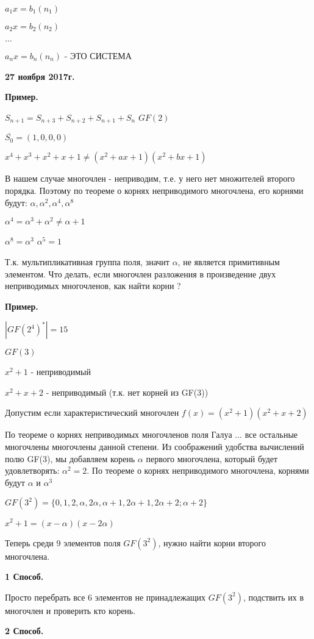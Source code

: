 \documentclass{article}
\begin{document}
$a_1x = b_1(n_1)$

$a_2x = b_2(n_2)$

$\ldots$

$a_nx = b_n(n_n)$ - ЭТО СИСТЕМА

\textbf {27 ноября 2017г.}

{\bf Пример.}

$S_{n+1}=S_{n+3}+S_{n+2}+S_{n+1}+S_n$ $GF(2)$

$\overline{S_0}=(1, 0, 0, 0)$

$x^4+x^3+x^2+x+1\ne (x^2+ax+1)(x^2+bx+1)$

В нашем случае многочлен - неприводим, т.е. у него нет множителей второго порядка. Поэтому по теореме о корнях неприводимого многочлена, его корнями будут: $\alpha, \alpha^2, \alpha^4, \alpha^8$

$\alpha^4=\alpha^3+\alpha^2\ne \alpha+1$

$\alpha^8=\alpha^3$ $\alpha^5=1$

Т.к. мультипликативная группа поля, значит $\alpha$, не является примитивным элементом. Что делать, если многочлен разложения в произведение двух неприводимых многочленов, как найти корни ?

{\bf Пример.}

$|GF(2^4)^*|=15$

$GF(3)$

$x^2+1$ - неприводимый

$x^2+x+2$ - неприводимый (т.к. нет корней из GF(3))

Допустим если характеристический многочлен $f(x)=(x^2+1)(x^2+x+2)$

По теореме о корнях неприводимых многочленов поля Галуа ... все остальные многочлены многочлены данной степени. Из соображений удобства вычислений полю GF(3), мы добавляем корень $\alpha$ первого многочлена, который будет удовлетворять: $\alpha^2=2$. По теореме о корнях неприводимого многочлена, корнями будут $\alpha$ и $\alpha^3$

$GF(3^2)=\{0, 1, 2, \alpha, 2\alpha, \alpha+1, 2\alpha+1, 2\alpha+2; \alpha+2\}$

$x^2+1=(x-\alpha)(x-2\alpha)$

Теперь среди 9 элементов поля $GF(3^2)$, нужно найти корни второго многочлена.

{\bf 1 Способ.}

Просто перебрать все 6 элементов не принадлежащих $GF(3^2)$, подствить их в многочлен и проверить кто корень.

{\bf 2 Способ.}
\end{document}

